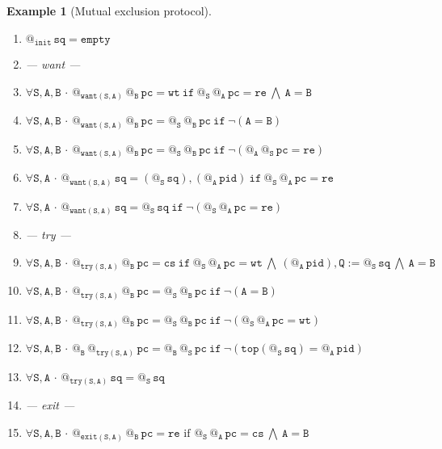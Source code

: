 \documentclass{article}
\makeatletter
\newcommand{\Q}{\mathtt{Q}}
\newcommand{\B}{\mathtt{B}}
\newcommand{\A}{\mathtt{A}}
\renewcommand{\S}{\mathtt{S}}
\newcommand{\pc}{{\mathtt{pc}}}
\newcommand{\pid}{{\mathtt{pid}}}
\newcommand{\sq}{{\mathtt{sq}}}
\newcommand{\re}{{\mathtt{re}}}
\newcommand{\wt}{{\mathtt{wt}}}
\newcommand{\cs}{{\mathtt{cs}}}
\newcommand{\Top}{{\mathtt{top}}}
\newcommand{\If}{{\ \mathtt{if}\ }}
\newcommand{\Empty}{{\mathtt{empty}}}
\newcommand{\init}{{\mathtt{init}}}
\newcommand{\want}{{\mathtt{want}}}
\newcommand{\try}{{\mathtt{try}}}
\newcommand{\exit}{{\mathtt{exit}}}
\newcommand{\at}[1]{@_{#1}\,}
\newcommand{\Forall}[1]{\forall #1\,{\cdot}\,}
\renewcommand{\land}{\ \bigwedge\ }
\newtheorem{example}{Example}
\makeatother
\begin{document}
\begin{example} [Mutual exclusion protocol]
\begin{enumerate}[label=(\arabic*),ref=\arabic*, leftmargin=*]
 \item \label{sen-4}$\at{\init}\sq=\Empty$ 
 
 \item[] --- want --- 

 \item \label{sen-5}$\Forall{\S,\A,\B} \at{\want(\S,\A)} \at{\B}  \pc=\wt \If \at{\S} \at{\A} \pc=\re \land \A=\B$
 
 \item \label{sen-6}$\Forall{\S,\A,\B} \at{\want(\S,\A)} \at{\B} \pc= \at{\S} \at{\B} \pc \If  \neg(\A = \B) $
 
 \item \label{sen-7}$\Forall{\S,\A,\B} \at{\want(\S,\A)} \at{\B}  \pc= \at{\S} \at{\B} \pc \If  \neg(\at{\A}\at{\S}\pc = \re)$
  
 \item \label{sen-8}$\Forall{\S,\A} \at{\want(\S,\A)}\sq = (\at{\S}\sq), (\at{\A} \pid) \If \at{\S} \at{\A} \pc=\re$

 \item \label{sen-9}$\Forall{\S,\A} \at{\want(\S,\A)}\sq = \at{\S}\sq \If \neg(\at{\S} \at{\A} \pc=\re)$  
 
 \item[] --- try ---

 \item \label{sen-10}$\Forall{\S,\A,\B} \at{\try(\S,\A)} \at{\B} \pc= \cs \If \at{\S} \at{\A} \pc = \wt \land (\at{\A}\pid), \Q := \at{\S} \sq \land \A = \B$
 
 \item \label{sen-11}$\Forall{\S,\A,\B} \at{\try(\S,\A)} \at{\B} \pc = \at{\S} \at{\B} \pc \If  \neg(\A=\B)$
 
 \item \label{sen-12}$\Forall{\S,\A,\B} \at{\try(\S,\A)} \at{\B} \pc=  \at{\S}  \at{\B} \pc \If \neg(\at{\S} \at{\A} \pc = \wt )$
  
 \item \label{sen-13}$\Forall{\S,\A,\B} \at{\B}\at{\try(\S,\A)}\pc= \at{\B} \at{\S} \pc \If  \neg(\Top(\at{\S}\sq) = \at{\A}\pid) $
  

 \item \label{sen-14}$\Forall{\S,\A} \at{\try(\S,\A)} \sq = \at{\S}\sq$  
 
 \item[] --- exit ---
 
 \item \label{sen-15}$\Forall{\S, \A,\B}  \at{\exit(\S,\A) }\at{\B}\pc = \re \text{ if } \at{\S} \at{\A} \pc = \cs \land \A = \B$
 

\end{enumerate}
\end{example}
\end{document}
